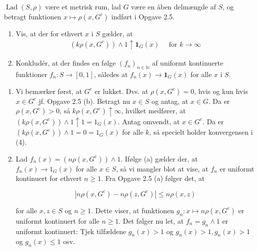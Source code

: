 \documentclass{Class}
\newcommand{\1}{\mathbbm{1}}
\theoremstyle{boxed}
\begin{document}
$\operatorname{Lad}(S, \rho)$ være et metrisk rum, lad $G$ være en åben delmængde af $S$, og betragt funktionen $x \mapsto \rho\left(x, G^c\right)$ indført i Opgave 2.5.
\begin{enumerate}
  \item Vis, at der for ethvert $x$ i $S$ gælder, at
  \begin{align}
    \left(k \rho\left(x, G^c\right)\right) \wedge 1 \uparrow \mathbf{1}_G(x) \quad \text { for } k \rightarrow \infty
  \end{align}
  \item  Konkludér, at der findes en følge $\left(f_n\right)_{n \in \mathbb{N}}$ af uniformt kontinuerte funktioner $f_n: S \rightarrow[0,1]$, således at $f_n(x) \rightarrow \mathbf{1}_G(x)$ for alle $x$ i $S$.
\end{enumerate}
\solution
\begin{enumerate}
  \item Vi bemærker først, at $G^{\mathrm{c}}$ er lukket. Dvs. at $\rho\left(x, G^{\mathrm{c}}\right)=0$, hvis og kun hvis $x \in G^{\mathrm{c}}$ jf. Opgave 2.5 (b). Betragt nu $x \in S$ og antag, at $x \in G$. Da er $\rho\left(x, G^{\mathrm{c}}\right)>0$, så $k \rho\left(x, G^{\mathrm{c}}\right) \uparrow \infty$, hvilket medfører, at $\left(k \rho\left(x, G^{\mathrm{c}}\right)\right) \wedge 1 \uparrow 1=1_G(x)$. Antag omvendt, at $x \in G^{\mathrm{c}}$. Da er $\left(k \rho\left(x, G^{\mathrm{c}}\right)\right) \wedge 1=0=1_G(x)$ for alle $k$, så specielt holder konvergensen i (4).
  \item Lad $f_n(x)=\left(n \rho\left(x, G^{\mathrm{c}}\right)\right) \wedge 1$. Ifølge (a) gælder der, at $f_n(x) \rightarrow 1_G(x)$ for alle $x \in S$, så vi mangler blot at vise, at $f_n$ er uniformt kontinuert for ethvert $n \geq 1$. Fra Opgave 2.5 (a) følger det, at

  $$
  \left|n \rho\left(x, G^{\mathrm{c}}\right)-n \rho\left(z, G^{\mathrm{c}}\right)\right| \leq n \rho(x, z)
  $$
  
  for alle $x, z \in S$ og $n \geq 1$. Dette viser, at funktionen $g_n: x \mapsto n \rho\left(x, G^{\mathrm{c}}\right)$ er uniformt kontinuert for alle $n \geq 1$. Det følger nu let, at $f_n=g_n \wedge 1$ er uniformt kontinuert: Tjek tilfældene $g_n(x)>1$ og $g_n(x)>1, g_n(x)>1$ og $g_n(x) \leq 1$ osv.
\end{enumerate}
\end{document}

